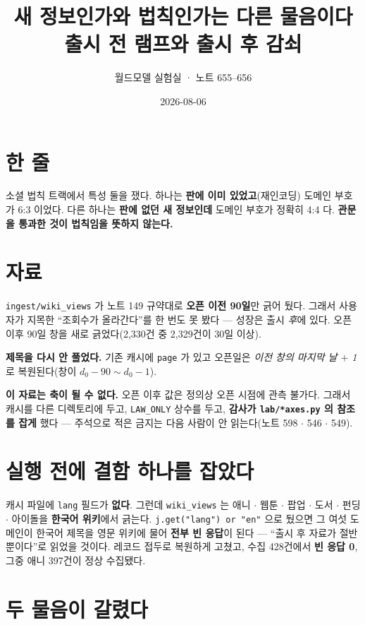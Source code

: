 \documentclass[10pt,a4paper]{article}
\title{\bfseries 새 정보인가와 법칙인가는 다른 물음이다\\[2pt]
\large 출시 전 램프와 출시 후 감쇠}
\author{월드모델 실험실 · 노트 655--656}
\date{2026-08-06}
\begin{document}
\maketitle

\section{한 줄}

소셜 법칙 트랙에서 특성 둘을 쟀다. 하나는 \textbf{판에 이미 있었고}(재인코딩)
도메인 부호가 6:3 이었다. 다른 하나는 \textbf{판에 없던 새 정보인데} 도메인
부호가 정확히 4:4 다. \textbf{관문을 통과한 것이 법칙임을 뜻하지 않는다.}

\section{자료}

\verb|ingest/wiki_views| 가 노트 149 규약대로 \textbf{오픈 이전 90일}만 긁어
뒀다. 그래서 사용자가 지목한 ``조회수가 올라간다''를 한 번도 못 봤다 --- 성장은
출시 \emph{후}에 있다. 오픈 이후 90일 창을 새로 긁었다(2,330건 중 2,329건이
30일 이상).

\textbf{제목을 다시 안 풀었다.} 기존 캐시에 \verb|page| 가 있고 오픈일은
\emph{이전 창의 마지막 날 $+$ 1} 로 복원된다(창이 $d_0{-}90 \sim d_0{-}1$).

\textbf{이 자료는 축이 될 수 없다.} 오픈 이후 값은 정의상 오픈 시점에 관측
불가다. 그래서 캐시를 다른 디렉토리에 두고, \verb|LAW_ONLY| 상수를 두고,
\textbf{감사가 \texttt{lab/*axes.py} 의 참조를 잡게} 했다 --- 주석으로 적은
금지는 다음 사람이 안 읽는다(노트 598 $\cdot$ 546 $\cdot$ 549).

\section{실행 전에 결함 하나를 잡았다}

캐시 파일에 \verb|lang| 필드가 \textbf{없다}. 그런데 \verb|wiki_views| 는
애니 $\cdot$ 웹툰 $\cdot$ 팝업 $\cdot$ 도서 $\cdot$ 펀딩 $\cdot$ 아이돌을
\textbf{한국어 위키}에서 긁는다. \verb|j.get("lang") or "en"| 으로 뒀으면 그
여섯 도메인이 한국어 제목을 영문 위키에 물어 \textbf{전부 빈 응답}이 된다 ---
``출시 후 자료가 절반뿐이다''로 읽었을 것이다. 레코드 접두로 복원하게 고쳤고,
수집 428건에서 \textbf{빈 응답 0}, 그중 애니 397건이 정상 수집됐다.

\section{두 물음이 갈렸다}
\end{document}
